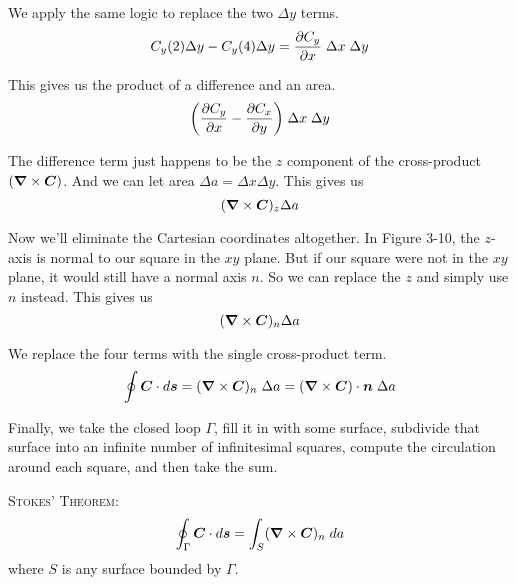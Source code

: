 We apply the same logic to replace the two $\Delta y$ terms.
\begin{equation}
  C_y(2) \Delta y - C_y(4) \Delta y = \frac{\partial C_y}{\partial x} \; \Delta x \; \Delta y
\end{equation}

This gives us the product of a difference and an area.
\begin{equation}
  \bigg( \frac{\partial C_y}{\partial x} - \frac{\partial C_x}{\partial y} \bigg) \; \Delta x \; \Delta y
\end{equation}

The difference term just happens to be the $z$ component of 
the cross-product $(\boldsymbol{\nabla} \times \boldsymbol{C})$.
And we can let area $\Delta a = \Delta x \Delta y$.
This gives us 
\[ (\boldsymbol{\nabla} \times \boldsymbol{C})_z \Delta a \]

Now we'll eliminate the Cartesian coordinates altogether.
In Figure 3-10, the $z$-axis is normal to our square in the $xy$ plane.
But if our square were not in the $xy$ plane, it would still have a normal axis $n$.
So we can replace the $z$ and simply use $n$ instead.
This gives us 
\[ (\boldsymbol{\nabla} \times \boldsymbol{C})_n \Delta a \]

We replace the four terms with the single cross-product term.
\begin{equation}
  \oint \boldsymbol{C} \cdot d\boldsymbol{s}
  = (\boldsymbol{\nabla} \times \boldsymbol{C})_n \; \Delta a 
  = (\boldsymbol{\nabla} \times \boldsymbol{C}) \cdot \boldsymbol{n} \; \Delta a
\end{equation}

Finally, we take the closed loop $\Gamma$, fill it in with some surface,
subdivide that surface into an infinite number of infinitesimal squares,
compute the circulation around each square, and then take the sum.

\hspace{2em} \textsc{Stokes' Theorem:}
\begin{equation}
  \oint_\Gamma \boldsymbol{C} \cdot d\boldsymbol{s} = \int_S (\boldsymbol{\nabla} \times \boldsymbol{C})_n \; da
\end{equation}
\hspace{2em} where $S$ is any surface bounded by $\Gamma$.

\newpage

